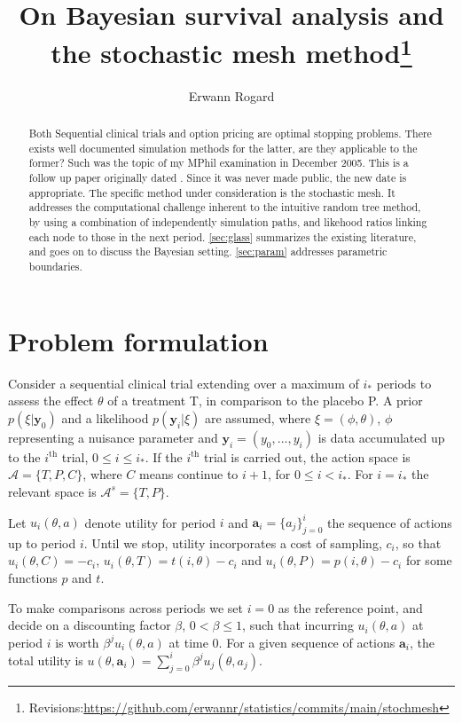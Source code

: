 \documentclass[11pt]{article}
\title{On Bayesian survival analysis and the stochastic mesh method\footnote{Revisions:\url{https://github.com/erwannr/statistics/commits/main/stochmesh}}}
\author{Erwann Rogard}
\date{\ThisDate}
\begin{document}
\maketitle

\begin{abstract}Both Sequential clinical trials and option pricing are optimal stopping problems. There exists well documented simulation methods for the latter,
  are they applicable to the former? Such was the topic of my MPhil examination in December 2005. This is a follow up paper originally dated \origDate. Since it was never made public, the new date is appropriate. The specific method under consideration is the stochastic mesh. It addresses the computational challenge inherent to the intuitive random tree method, by using a combination of independently simulation paths, and likehood ratios linking each node to those in the next period. \autoref{sec:glass} summarizes the existing literature, and goes on to discuss the Bayesian setting. \autoref{sec:param} addresses parametric boundaries.\end{abstract}

\section{Problem formulation}\label{sec:glass}
Consider a sequential clinical trial extending over a maximum of $i_*$ periods to assess the effect $\theta$ of a treatment T, in comparison to the placebo P. A prior
$\nonumber p(\xi|\mathbf{y}_0)$ and a likelihood $p(\mathbf{y}_i|\xi)$ are assumed, 
where $\xi=(\phi,\theta)$, $\phi$ representing a nuisance parameter and $\mathbf{y}_i=(y_0,...,y_i)$ is data accumulated up to the $i^{\mathrm{th}}$ trial, $0\leq i\leq i_*$. If the $i^{\mathrm{th}}$ trial is carried out, the action space is $\mathcal{A}=\{T,P,C\}$, where $C$ means continue to $i+1$, for $0\leq i<i_*$. For $i=i_*$ the relevant space is $\mathcal{A}^{s}=\{T,P\}$.

Let $u_i(\theta,a)$ denote utility for period $i$ and $\mathbf{a}_i=\{a_j\}_{j=0}^i$ the sequence of actions up to period $i$. Until we stop, utility incorporates a cost of sampling, $c_i$, so that $u_i(\theta,C)=-c_i$, $u_i(\theta,T)=t(i,\theta)-c_i$ and $u_i(\theta,P)=p(i,\theta)-c_i$ for some functions $p$ and $t$. 

To make comparisons across periods we set $i=0$ as the reference point, and decide on a discounting factor $\beta$, $0<\beta\leq 1$, such that incurring $u_i(\theta,a)$ at period $i$ is worth $\beta^ j u_i(\theta,a)$ at time $0$. For a given sequence of actions $\mathbf{a}_i$, the total utility is $u(\theta,\mathbf{a}_i)=\sum_{j=0}^i \beta^j u_j(\theta,a_j)$.
\end{document}
